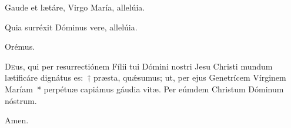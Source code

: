 \noindent \vv Gaude et lætáre, Virgo María, allelúia.

\noindent \rr Quia surréxit Dóminus vere, allelúia.

Orémus.

\lettrine{D}{e}us, qui per resurrectiónem Fílii tui Dómini nostri Jesu Christi mundum lætificáre dignátus es:~† præsta, quǽsumus; ut, per ejus Genetrícem Vírginem Maríam~* perpétuæ capiámus gáudia vitæ. Per eúmdem Christum Dóminum nóstrum. 

\rr Amen.